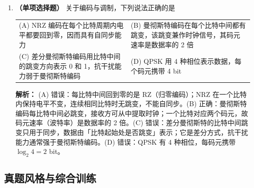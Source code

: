 \begin{enumerate}
\ifshowsolutions\par\noindent\textbf{解析：} (A) 错误：FDM 按频率划分，各子信道同时占用不同频带；按时间片划分的是 TDM。(B) 正确：同步 TDM 的时隙是预先固定分配的，某路无数据时该时隙空置浪费，这也是统计时分复用（STDM）按需分配时隙的出发点。(C) 错误：WDM 本质上就是光纤上的频分复用，各信号调制到不同波长（频率）上。(D) 错误：CDM 中各用户在同一时间、同一频带内传输，靠相互正交的码型区分，接收端做相关运算而非带通滤波。\else \answerarea \fi

\vspace{8pt}

\item \textbf{（单项选择题）} 关于编码与调制，下列说法正确的是
\begin{center}
\begin{tabular}{p{7.2cm}p{7.2cm}}
(A) NRZ 编码在每个比特周期内电平都要回到零，因而具有自同步能力 & (B) 曼彻斯特编码在每个比特中间都有跳变，该跳变兼作时钟信号，其码元速率是数据率的 2 倍 \\[4pt]
(C) 差分曼彻斯特编码用比特中间的跳变方向表示 0 和 1，抗干扰能力弱于曼彻斯特编码 & (D) QPSK 用 4 种相位表示数据，每个码元携带 4 bit
\end{tabular}
\end{center}

\ifshowsolutions\par\noindent\textbf{解析：} (A) 错误：每比特中间回到零的是 RZ（归零编码）；NRZ 在一个比特内保持电平不变，连续相同比特时无跳变，不能自同步。(B) 正确：曼彻斯特编码每比特中间必跳变，接收方可从中提取时钟；一个比特对应两个码元，故码元速率（波特率）是数据率的 2 倍。(C) 错误：差分曼彻斯特的比特中间跳变只用于同步，数据由「比特起始处是否跳变」表示；它是差分方式，抗干扰能力通常强于曼彻斯特编码。(D) 错误：QPSK 有 4 种相位，每码元携带 $\log_2 4=2$ bit。\else \answerarea \fi

\end{enumerate}

\subsection{真题风格与综合训练}

